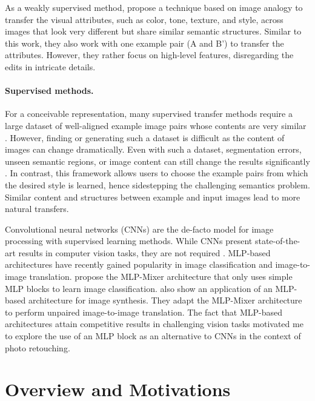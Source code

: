 As a weakly supervised method, \citeauthor{visual_attribute} \cite{visual_attribute} propose a technique based on image analogy \cite{Hertzmann01Image} to transfer the visual attributes, such as color, tone, texture, and style, across images that look very different but share similar semantic structures. Similar to this work, they also work with one example pair (A and B') to transfer the attributes. However, they rather focus on high-level features, disregarding the edits in intricate details.

\paragraph{Supervised methods.} 
For a conceivable representation, many supervised transfer methods require a large dataset of well-aligned example image pairs whose contents are very similar \cite{kim2021representative, wang2019underexposed}. However, finding or generating such a dataset is difficult as the content of images can change dramatically. Even with such a dataset, segmentation errors, unseen semantic regions, or image content can still change the results significantly \cite{10.1145/2790296}. In contrast, this framework allows users to choose the example pairs from which the desired style is learned, hence sidestepping the challenging semantics problem. Similar content and structures between example and input images lead to more natural transfers.


Convolutional neural networks (CNNs) are the de-facto model for image processing with supervised learning methods. While CNNs present state-of-the-art results in computer vision tasks, they are not required \cite{tolstikhin2021mlp}. MLP-based architectures have recently gained popularity in image classification and image-to-image translation. \citeauthor{cazenavette2021mixergan} \cite{cazenavette2021mixergan} propose the MLP-Mixer architecture that only uses simple MLP blocks to learn image classification. \citeauthor{cazenavette2021mixergan} \cite{cazenavette2021mixergan} also show an application of an MLP-based architecture for image synthesis. They adapt the MLP-Mixer architecture \cite{tolstikhin2021mlp} to perform unpaired image-to-image translation. The fact that MLP-based architectures attain competitive results in challenging vision tasks motivated me to explore the use of an MLP block as an alternative to CNNs in the context of photo retouching.

\section{Overview and Motivations}
\label{chap:motivations}

